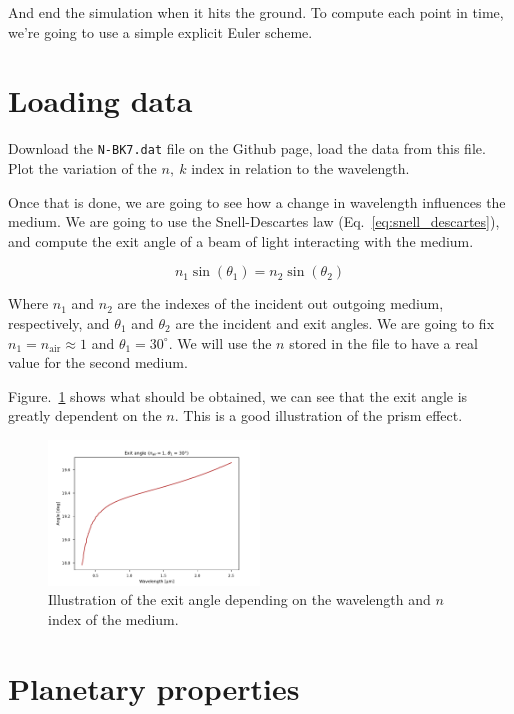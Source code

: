 \documentclass[twocolumn]{article}
\begin{document}
And end the simulation when it hits the ground. To compute each point in time, we're going to use a simple explicit Euler scheme.

\section{Loading data}\label{sec:loading_data}

Download the \verb|N-BK7.dat| file on the Github page, load the data from this file. Plot the variation of the $n,~k$ index in relation to the wavelength.

Once that is done, we are going to see how a change in wavelength influences the medium. We are going to use the Snell-Descartes law (Eq.~\ref{eq:snell_descartes}), and compute the exit angle of a beam of light interacting with the medium.

\begin{equation}\label{eq:snell_descartes}
    n_1\sin(\theta_1) = n_2\sin(\theta_2)
\end{equation}

Where $n_1$ and $n_2$ are the indexes of the incident out outgoing medium, respectively, and $\theta_1$ and $\theta_2$ are the incident and exit angles. We are going to fix $n_1 = n_{\mathrm{air}} \approx 1$ and $\theta_1 = 30^\circ$. We will use the $n$ stored in the file to have a real value for the second medium.

Figure.~\ref{fig:exit_angle} shows what should be obtained, we can see that the exit angle is greatly dependent on the $n$. This is a good illustration of the prism effect.

\begin{figure}
\centering
\includegraphics[width=0.5\textwidth]{figures/exit_angle.pdf}
\caption{Illustration of the exit angle depending on the wavelength and $n$ index of the medium.}
\label{fig:exit_angle}
\end{figure}

\section{Planetary properties}\label{sec:planetary_properties}
\end{document}
